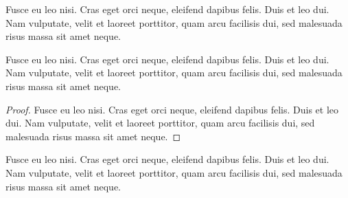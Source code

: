 \documentclass[a4paper,UKenglish,cleveref, autoref]{lipics-v2019}
\begin{document}
\begin{claim}\label{testenv-claim}
Fusce eu leo nisi. Cras eget orci neque, eleifend dapibus felis. Duis et leo dui. Nam vulputate, velit et laoreet porttitor, quam arcu facilisis dui, sed malesuada risus massa sit amet neque.
\end{claim}

\begin{claim*}\label{testenv-claim2}
Fusce eu leo nisi. Cras eget orci neque, eleifend dapibus felis. Duis et leo dui. Nam vulputate, velit et laoreet porttitor, quam arcu facilisis dui, sed malesuada risus massa sit amet neque.
\end{claim*}

\begin{proof}
Fusce eu leo nisi. Cras eget orci neque, eleifend dapibus felis. Duis et leo dui. Nam vulputate, velit et laoreet porttitor, quam arcu facilisis dui, sed malesuada risus massa sit amet neque.
\end{proof}

\begin{claimproof}
Fusce eu leo nisi. Cras eget orci neque, eleifend dapibus felis. Duis et leo dui. Nam vulputate, velit et laoreet porttitor, quam arcu facilisis dui, sed malesuada risus massa sit amet neque.
\end{claimproof}
\end{document}
